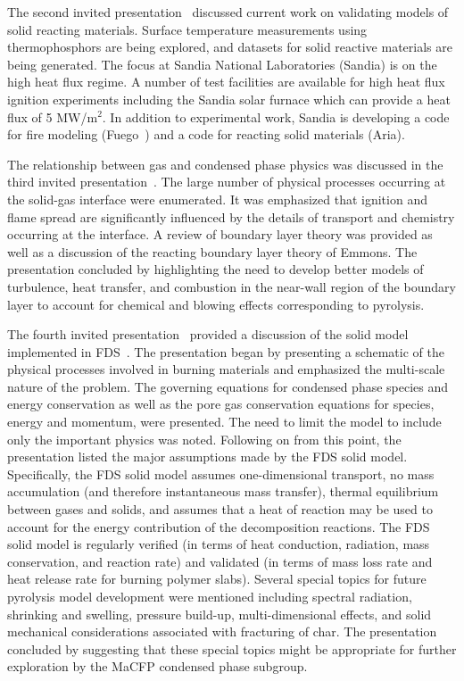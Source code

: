 The second invited presentation~\cite{CPS:Brown} discussed current work on validating models of solid reacting materials.  Surface temperature measurements using thermophosphors are being explored, and datasets for solid reactive materials are being generated.  The focus at Sandia National Laboratories (Sandia) is on the high heat flux regime.  A number of test facilities are available for high heat flux ignition experiments including the Sandia solar furnace which can provide a heat flux of 5 MW/m$^2$.  In addition to experimental work, Sandia is developing a code for fire modeling (Fuego~\cite{SIERRA/Fuego}) and a code for reacting solid materials (Aria).

The relationship between gas and condensed phase physics was discussed in the third invited presentation~\cite{CPS:Richard}.  The large number of physical processes occurring at the solid-gas interface were enumerated.  It was emphasized that ignition and flame spread are significantly influenced by the details of transport and chemistry occurring at the interface.  A review of boundary layer theory was provided as well as a discussion of the reacting boundary layer theory of Emmons.  The presentation concluded by highlighting the need to develop better models of turbulence, heat transfer, and combustion in the near-wall region of the boundary layer to account for chemical and blowing effects corresponding to pyrolysis.

The fourth invited presentation~\cite{CPS:Hostikka} provided a discussion of the solid model implemented in FDS~\cite{FDS}.  The presentation began by presenting a schematic of the physical processes involved in burning materials and emphasized the multi-scale nature of the problem.  The governing equations for condensed phase species and energy conservation as well as the pore gas conservation equations for species, energy and momentum, were presented.  The need to limit the model to include only the important physics was noted.  Following on from this point, the presentation listed the major assumptions made by the FDS solid model.  Specifically, the FDS solid model assumes one-dimensional transport, no mass accumulation (and therefore instantaneous mass transfer), thermal equilibrium between gases and solids, and assumes that a heat of reaction may be used to account for the energy contribution of the decomposition reactions.  The FDS solid model is regularly verified (in terms of heat conduction, radiation, mass conservation, and reaction rate) and validated (in terms of mass loss rate and heat release rate for burning polymer slabs).  Several special topics for future pyrolysis model development were mentioned including spectral radiation, shrinking and swelling, pressure build-up, multi-dimensional effects, and solid mechanical considerations associated with fracturing of char.  The presentation concluded by suggesting that these special topics might be appropriate for further exploration by the MaCFP condensed phase subgroup.

